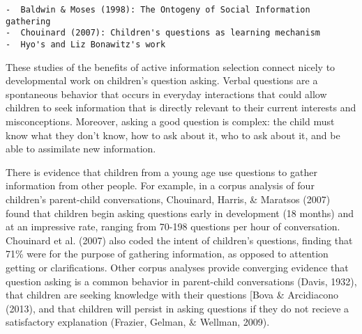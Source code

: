 \documentclass[a4paper,man,apacite,floatsintext]{apa6}
\begin{document}
\begin{verbatim}
-  Baldwin & Moses (1998): The Ontogeny of Social Information gathering
-  Chouinard (2007): Children's questions as learning mechanism
-  Hyo's and Liz Bonawitz's work
\end{verbatim}

These studies of the benefits of active information selection connect
nicely to developmental work on children's question asking. Verbal
questions are a spontaneous behavior that occurs in everyday
interactions that could allow children to seek information that is
directly relevant to their current interests and misconceptions.
Moreover, asking a good question is complex: the child must know what
they don't know, how to ask about it, who to ask about it, and be able
to assimilate new information.

There is evidence that children from a young age use questions to gather
information from other people. For example, in a corpus analysis of four
children's parent-child conversations, Chouinard, Harris, \& Maratsos
(2007) found that children begin asking questions early in development
(18 months) and at an impressive rate, ranging from 70-198 questions per
hour of conversation. Chouinard et al. (2007) also coded the intent of
children's questions, finding that 71\% were for the purpose of
gathering information, as opposed to attention getting or
clarifications. Other corpus analyses provide converging evidence that
question asking is a common behavior in parent-child conversations
(Davis, 1932), that children are seeking knowledge with their questions
{[}Bova \& Arcidiacono (2013), and that children will persist in asking
questions if they do not recieve a satisfactory explanation (Frazier,
Gelman, \& Wellman, 2009).
\end{document}
